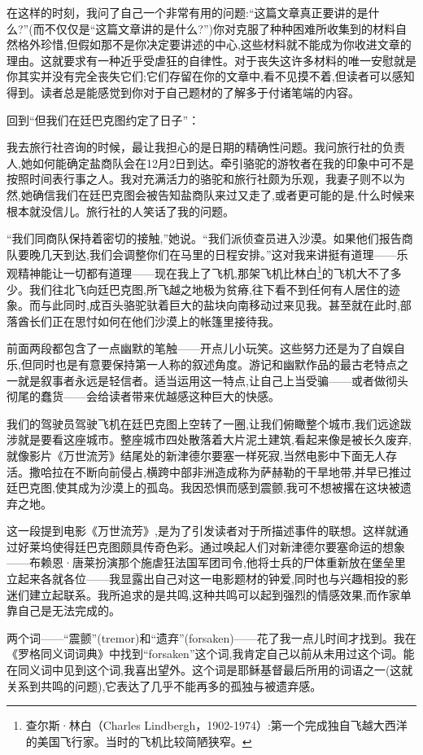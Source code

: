 在这样的时刻，我问了自己一个非常有用的问题:“这篇文章真正要讲的是什么?”(而不仅仅是“这篇文章讲的是什么?”)你对克服了种种困难所收集到的材料自然格外珍惜,但假如那不是你决定要讲述的中心,这些材料就不能成为你收进文章的理由。这就要求有一种近乎受虐狂的自律性。对于丧失这许多材料的唯一安慰就是你其实并没有完全丧失它们;它们存留在你的文章中,看不见摸不着,但读者可以感知得到。读者总是能感觉到你对于自己题材的了解多于付诸笔端的内容。

回到“但我们在廷巴克图约定了日子”：

我去旅行社咨询的时候，最让我担心的是日期的精确性问题。我问旅行社的负责人,她如何能确定盐商队会在12月2日到达。牵引骆驼的游牧者在我的印象中可不是按照时间表行事之人。我对充满活力的骆驼和旅行社颇为乐观，我妻子则不以为然,她确信我们在廷巴克图会被告知盐商队来过又走了,或者更可能的是,什么时候来根本就没信儿。旅行社的人笑话了我的问题。

“我们同商队保持着密切的接触,”她说。“我们派侦查员进入沙漠。如果他们报告商队要晚几天到达,我们会调整你们在马里的日程安排。”这对我来讲挺有道理——乐观精神能让一切都有道理——现在我上了飞机,那架飞机比林白\footnote{查尔斯·林白（Charles Lindbergh，1902-1974）:第一个完成独自飞越大西洋的美国飞行家。当时的飞机比较简陋狭窄。}的飞机大不了多少。我们往北飞向廷巴克图,所飞越之地极为贫瘠,往下看不到任何有人居住的迹象。而与此同时,成百头骆驼驮着巨大的盐块向南移动过来见我。甚至就在此时,部落酋长们正在思忖如何在他们沙漠上的帐篷里接待我。

前面两段都包含了一点幽默的笔触——开点儿小玩笑。这些努力还是为了自娱自乐,但同时也是有意要保持第一人称的叙述角度。游记和幽默作品的最古老特点之一就是叙事者永远是轻信者。适当运用这一特点,让自己上当受骗——或者做彻头彻尾的蠢货——会给读者带来优越感这种巨大的快感。

我们的驾驶员驾驶飞机在廷巴克图上空转了一圈,让我们俯瞰整个城市,我们远途跋涉就是要看这座城市。整座城市四处散落着大片泥土建筑,看起来像是被长久废弃,就像影片《万世流芳》结尾处的新津德尔要塞一样死寂,当然电影中下面无人存活。撒哈拉在不断向前侵占,横跨中部非洲造成称为萨赫勒的干旱地带,并早已推过廷巴克图,使其成为沙漠上的孤岛。我因恐惧而感到震颤,我可不想被撂在这块被遗弃之地。

这一段提到电影《万世流芳》,是为了引发读者对于所描述事件的联想。这样就通过好莱坞使得廷巴克图颇具传奇色彩。通过唤起人们对新津德尔要塞命运的想象——布赖恩·唐莱扮演那个施虐狂法国军团司令,他将士兵的尸体重新放在堡垒里立起来各就各位——我显露出自己对这一电影题材的钟爱,同时也与兴趣相投的影迷们建立起联系。我所追求的是共鸣,这种共鸣可以起到强烈的情感效果,而作家单靠自己是无法完成的。

两个词——“震颤”(tremor)和“遗弃”(forsaken)——花了我一点儿时间才找到。我在《罗格同义词词典》中找到“forsaken”这个词,我肯定自己以前从未用过这个词。能在同义词中见到这个词,我喜出望外。这个词是耶稣基督最后所用的词语之一(这就关系到共鸣的问题),它表达了几乎不能再多的孤独与被遗弃感。

